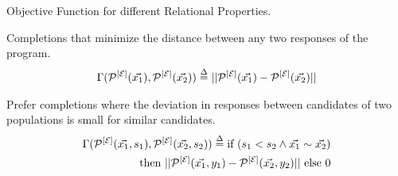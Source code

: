 \begin{frame}{Objective Function for different Relational Properties.}
    \vspace{20pt}
    \begin{tcolorbox}[
        colback=white,
        colframe=blue,
        colbacktitle=white!70!blue,
        coltitle=black,
        title=\textbf{Monotonicity, Robustness, Weak Non-Interference, Weak Equivalence},
        enhanced,
        attach boxed title to top left={yshift=-2mm, xshift=0.2cm},%
        ]
    Completions that minimize the distance between any two responses of the program.
    \begin{align*}
    \Gamma(\mathcal{P}_{}^{[\mathcal{E}]}(\vec{x_1}), \mathcal{P}_{}^{[\mathcal{E}]}(\vec{x_2})) \overset{\Delta}{=} ||\mathcal{P}_{}^{[\mathcal{E}]}(\vec{x_1}) - \mathcal{P}_{}^{[\mathcal{E}]}(\vec{x_2})||
\end{align*}
    \end{tcolorbox}
    \pause
        \vspace{20pt}
    \begin{tcolorbox}[
        colback=white,
        colframe=blue,
        colbacktitle=white!70!blue,
        coltitle=black,
        title=\textbf{Group Fairness},
        enhanced,
        attach boxed title to top left={yshift=-2mm, xshift=0.2cm},%
        ]
        Prefer completions where the deviation in responses between candidates of two populations is small for similar candidates.
    \begin{align*}
        \Gamma(\mathcal{P}_{}^{[\mathcal{E}]}(\vec{x_1}, {s_1}), \mathcal{P}_{}^{[\mathcal{E}]}(\vec{x_2}, {s_2})) \overset{\Delta}{=} \textrm{if } (s_1 < s_2 \land \vec{x_1} \sim \vec{x_2})\\ \textrm{ then }||\mathcal{P}_{}^{[\mathcal{E}]}(\vec{x_1}, {y_1}) - \mathcal{P}_{}^{[\mathcal{E}]}(\vec{x_2}, {y_2})|| \textrm{ else } 0
    \end{align*}
    \end{tcolorbox}
\end{frame}
